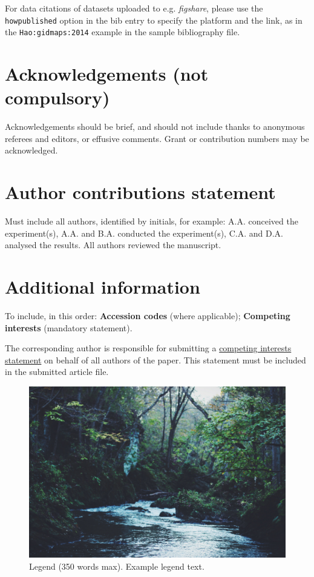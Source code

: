 \documentclass[fleqn,10pt]{wlscirep}
\begin{document}
For data citations of datasets uploaded to e.g. \emph{figshare}, please use the \verb|howpublished| option in the bib entry to specify the platform and the link, as in the \verb|Hao:gidmaps:2014| example in the sample bibliography file.

\section*{Acknowledgements (not compulsory)}

Acknowledgements should be brief, and should not include thanks to anonymous referees and editors, or effusive comments. Grant or contribution numbers may be acknowledged.

\section*{Author contributions statement}

Must include all authors, identified by initials, for example:
A.A. conceived the experiment(s),  A.A. and B.A. conducted the experiment(s), C.A. and D.A. analysed the results.  All authors reviewed the manuscript. 

\section*{Additional information}

To include, in this order: \textbf{Accession codes} (where applicable); \textbf{Competing interests} (mandatory statement). 

The corresponding author is responsible for submitting a \href{http://www.nature.com/srep/policies/index.html#competing}{competing interests statement} on behalf of all authors of the paper. This statement must be included in the submitted article file.

\begin{figure}[ht]
\centering
\includegraphics[width=\linewidth]{stream}
\caption{Legend (350 words max). Example legend text.}
\label{fig:stream}
\end{figure}
\end{document}
